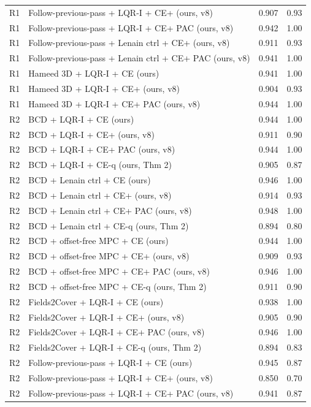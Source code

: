 \documentclass[preprint,12pt,authoryear]{elsarticle}
\begin{document}
\begin{longtable}{@{}l>{\raggedright\arraybackslash}p{20.8em}ll@{}}
R1 & Follow-previous-pass + LQR-I + CE+ (ours, v8) & 0.907 & 0.93 \\
R1 & Follow-previous-pass + LQR-I + CE+ PAC (ours, v8) & 0.942 & 1.00 \\
R1 & Follow-previous-pass + Lenain ctrl + CE+ (ours, v8) & 0.911 & 0.93 \\
R1 & Follow-previous-pass + Lenain ctrl + CE+ PAC (ours, v8) & 0.941 & 1.00 \\
R1 & Hameed 3D + LQR-I + CE (ours) & 0.941 & 1.00 \\
R1 & Hameed 3D + LQR-I + CE+ (ours, v8) & 0.904 & 0.93 \\
R1 & Hameed 3D + LQR-I + CE+ PAC (ours, v8) & 0.944 & 1.00 \\
R2 & BCD + LQR-I + CE (ours) & 0.944 & 1.00 \\
R2 & BCD + LQR-I + CE+ (ours, v8) & 0.911 & 0.90 \\
R2 & BCD + LQR-I + CE+ PAC (ours, v8) & 0.944 & 1.00 \\
R2 & BCD + LQR-I + CE-q (ours, Thm 2) & 0.905 & 0.87 \\
R2 & BCD + Lenain ctrl + CE (ours) & 0.946 & 1.00 \\
R2 & BCD + Lenain ctrl + CE+ (ours, v8) & 0.914 & 0.93 \\
R2 & BCD + Lenain ctrl + CE+ PAC (ours, v8) & 0.948 & 1.00 \\
R2 & BCD + Lenain ctrl + CE-q (ours, Thm 2) & 0.894 & 0.80 \\
R2 & BCD + offset-free MPC + CE (ours) & 0.944 & 1.00 \\
R2 & BCD + offset-free MPC + CE+ (ours, v8) & 0.909 & 0.93 \\
R2 & BCD + offset-free MPC + CE+ PAC (ours, v8) & 0.946 & 1.00 \\
R2 & BCD + offset-free MPC + CE-q (ours, Thm 2) & 0.911 & 0.90 \\
R2 & Fields2Cover + LQR-I + CE (ours) & 0.938 & 1.00 \\
R2 & Fields2Cover + LQR-I + CE+ (ours, v8) & 0.905 & 0.90 \\
R2 & Fields2Cover + LQR-I + CE+ PAC (ours, v8) & 0.946 & 1.00 \\
R2 & Fields2Cover + LQR-I + CE-q (ours, Thm 2) & 0.894 & 0.83 \\
R2 & Follow-previous-pass + LQR-I + CE (ours) & 0.945 & 0.87 \\
R2 & Follow-previous-pass + LQR-I + CE+ (ours, v8) & 0.850 & 0.70 \\
R2 & Follow-previous-pass + LQR-I + CE+ PAC (ours, v8) & 0.941 & 0.87 \\

\end{longtable}
\end{document}
